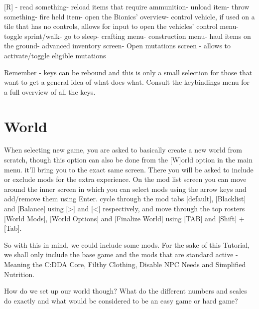 \documentclass[11pt]{report}
\begin{document}
[R] - read something\newline
[r] - reload items that require ammunition\newline
[U] - unload item\newline
[t] - throw something\newline
[f] - fire held item\newline
[p] - open the Bionics' overview\newline
[\^{}] - control vehicle, if used on a tile that has no controls, allows for input to open the vehicles' control menu\newline
["] - toggle sprint/walk\newline
[\$] - go to sleep\newline
[\&] - crafting menu\newline
[*] - construction menu\newline
[\textbackslash] - haul items on the ground\newline
[/] - advanced inventory screen\newline
[[] - Open mutations screen - allows to activate/toggle eligible mutations
 
Remember - keys can be rebound and this is only a small selection for those that want to get a general idea of what does what. Consult the keybindings menu for a full overview of all the keys. 

\chapter{World}

When selecting new game, you are asked to basically create a new world from scratch, though this option can also be done from the [W]orld option in the main menu. it'll bring you to the exact same screen. There you will be asked to include or exclude mods for the extra experience.
On the mod list screen you can move around the inner screen in which you can select mods using the arrow keys and add/remove them using Enter. cycle through the mod tabs [default], [Blacklist] and [Balance] using [>] and [<] respectively, and move through the top rosters [World Mods], [World Options] and [Finalize World] using [TAB] and [Shift] + [Tab].

So with this in mind, we could include some mods. For the sake of this Tutorial, we shall only include the base game and the mods that are standard active - Meaning the C:DDA Core, Filthy Clothing, Disable NPC Needs and Simplified Nutrition.

How do we set up our world though? What do the different numbers and scales do exactly and what would be considered to be an easy game or hard game?
\end{document}
